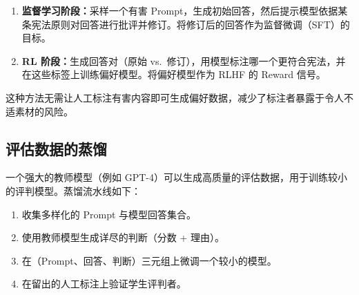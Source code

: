 \begin{enumerate}
  \item \textbf{监督学习阶段：}采样一个有害 Prompt，生成初始回答，然后提示模型依据某条宪法原则对回答进行批评并修订。将修订后的回答作为监督微调（SFT）的目标。
  \item \textbf{RL 阶段：}生成回答对（原始 vs.~修订），用模型标注哪一个更符合宪法，并在这些标签上训练偏好模型。将偏好模型作为 RLHF 的 Reward 信号。
\end{enumerate}

这种方法无需让人工标注有害内容即可生成偏好数据，减少了标注者暴露于令人不适素材的风险。

\subsection{评估数据的蒸馏}
\label{distillation-for-evaluation-data}

一个强大的教师模型（例如 GPT-4）可以生成高质量的评估数据，用于训练较小的评判模型。蒸馏流水线如下：

\begin{enumerate}
  \item 收集多样化的 Prompt 与模型回答集合。
  \item 使用教师模型生成详尽的判断（分数 + 理由）。
  \item 在（Prompt、回答、判断）三元组上微调一个较小的模型。
  \item 在留出的人工标注上验证学生评判者。
\end{enumerate}

